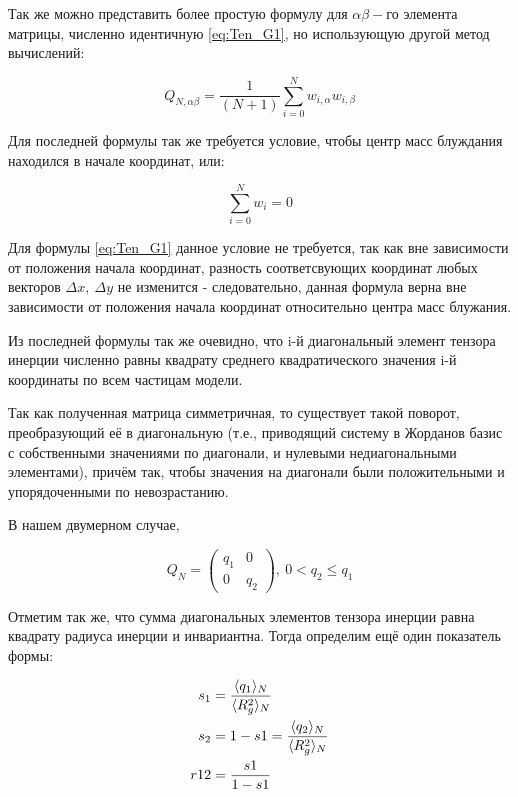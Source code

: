 Так же можно представить более простую формулу для  $\alpha\beta-$го элемента матрицы, численно идентичную \eqref{eq:Ten_G1}, но использующую другой метод вычислений:

\begin{equation}\label{eq:Ten_G2}
    Q_{N,\alpha\beta} = \frac{1}{(N+1)} \sum_{i=0}^{N} w_{i, \alpha} w_{i, \beta}
\end{equation}

Для последней формулы так же требуется условие, чтобы центр масс блуждания находился в начале координат, или:

\begin{equation*}
    \sum^{N}_{i=0}w_{i} = 0
\end{equation*}

Для формулы \eqref{eq:Ten_G1} данное условие не требуется, так как вне зависимости от положения начала координат, разность соответсвующих координат любых векторов $\Delta x,\ \Delta y$ не изменится - следовательно, данная формула верна вне зависимости от положения начала координат относительно центра масс блужания.

Из последней формулы так же очевидно, что i-й диагональный элемент тензора инерции численно равны квадрату среднего квадратического значения i-й координаты по всем частицам модели.

Так как полученная матрица симметричная, то существует такой поворот, преобразующий её в диагональную (т.е., приводящий систему в Жорданов базис с собственными значениями по диагонали, и нулевыми недиагональными элементами), причём так, чтобы значения на диагонали были положительными и упорядоченными по невозрастанию.

В нашем двумерном случае, 

\begin{equation*}
    Q_{N} = \left(
    \begin{array}{cc}
      q_{1} & 0 \\
      0 & q_{2}
    \end{array} \right),\ 0 < q_{2} \leq q_{1}
\end{equation*}

Отметим так же, что сумма диагональных элементов тензора инерции равна квадрату радиуса инерции и инвариантна. Тогда определим ещё один показатель формы:

\begin{align*}
    s_{1} &= \frac{\langle q_{1} \rangle_{N}}{\langle R_{g}^{2} \rangle_{N}}\\
    s_{2} &= 1 - s1 = \frac{\langle q_{2} \rangle_{N}}{\langle R_{g}^{2} \rangle_{N}}\\
    r12 &= \frac{s1}{1-s1}
\end{align*}

